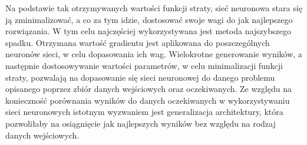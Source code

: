 \noindent Na podstawie tak otrzymywanych wartości funkcji straty, sieć neuronowa stara się ją zminimalizować, a co za tym idzie, dostosować swoje wagi do jak najlepszego rozwiązania. W tym celu najczęściej wykorzystywana jest metoda najszybszego spadku. Otrzymana wartość gradientu jest aplikowana do poszczególnych neuronów sieci, w celu dopasowania ich wag. Wielokrotne generowanie wyników, a następnie dostosowywanie wartości parametrów, w celu minimalizacji funkcji straty, pozwalają na dopasowanie się sieci neuronowej do danego problemu opisanego poprzez zbiór danych wejściowych oraz oczekiwanych. Ze względu na konieczność porównania wyników do danych oczekiwanych w wykorzystywaniu sieci neuronowych istotnym wyzwaniem jest generalizacja architektury, która pozwoliłaby na osiągnięcie jak najlepszych wyników bez względu na rodzaj danych wejściowych.
